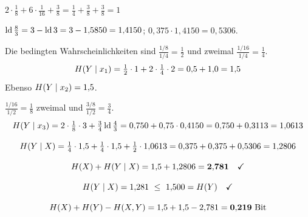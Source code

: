 \begin{aufgabe}
 $2\cdot\tfrac18 + 6\cdot\tfrac1{16} + \tfrac38 = \tfrac14+\tfrac38+\tfrac38 = 1$ \checkmark

 $\operatorname{ld}\frac{8}{3} = 3 - \operatorname{ld} 3 = 3-1{,}5850 = 1{,}4150$; $0{,}375\cdot1{,}4150 = 0{,}5306$.

 Die bedingten Wahrscheinlichkeiten sind $\frac{1/8}{1/4} = \frac12$ und zweimal $\frac{1/16}{1/4} = \frac14$.
\[ H(Y\mid x_1) = \tfrac12\cdot1 + 2\cdot\tfrac14\cdot2 = 0{,}5+1{,}0 = 1{,}5 \]
Ebenso $H(Y\mid x_2) = 1{,}5$.

 $\frac{1/16}{1/2} = \frac18$ zweimal und $\frac{3/8}{1/2} = \frac34$.
\[ H(Y\mid x_3) = 2\cdot\tfrac18\cdot3 + \tfrac34\operatorname{ld}\tfrac43 = 0{,}750 + 0{,}75\cdot0{,}4150 = 0{,}750+0{,}3113 = 1{,}0613 \]

\[ H(Y\mid X) = \tfrac14\cdot1{,}5 + \tfrac14\cdot1{,}5 + \tfrac12\cdot1{,}0613 = 0{,}375+0{,}375+0{,}5306 = 1{,}2806 \]

\[ H(X) + H(Y\mid X) = 1{,}5 + 1{,}2806 = \mathbf{2{,}781} \quad \checkmark \]

\[ H(Y\mid X) = 1{,}281 \ \le\ 1{,}500 = H(Y) \quad \checkmark \]

\begin{center}
\begin{minipage}{0.88\textwidth}
\end{minipage}
\end{center}

\[ H(X)+H(Y)-H(X,Y) = 1{,}5+1{,}5-2{,}781 = \mathbf{0{,}219} \ \text{Bit} \]
\end{aufgabe}


